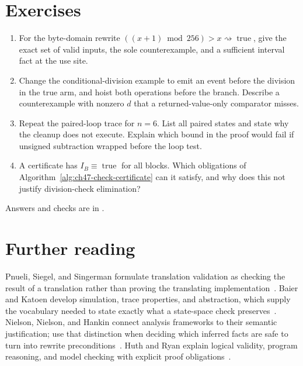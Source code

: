 \section{Exercises}
\label{sec:ch47-exercises}

\begin{enumerate}
\item For the byte-domain rewrite $((x+1)\bmod256)>x\rightsquigarrow\operatorname{true}$, give the exact set of valid inputs, the sole counterexample, and a sufficient interval fact at the use site.\label{ex:ch47-byte-guard}
\item Change the conditional-division example to emit an event before the division in the true arm, and hoist both operations before the branch. Describe a counterexample with nonzero $d$ that a returned-value-only comparator misses.\label{ex:ch47-event-hoist}
\item Repeat the paired-loop trace for $n=6$. List all paired states and state why the cleanup does not execute. Explain which bound in the proof would fail if unsigned subtraction wrapped before the loop test.\label{ex:ch47-loop-pairs}
\item A certificate has $I_B\equiv\operatorname{true}$ for all blocks. Which obligations of Algorithm~\ref{alg:ch47-check-certificate} can it satisfy, and why does this not justify division-check elimination?\label{ex:ch47-vacuous-certificate}
\end{enumerate}
Answers and checks are in .

\section{Further reading}
\label{sec:ch47-reading}

Pnueli, Siegel, and Singerman formulate translation validation as checking the result of a translation rather than proving the translating implementation~\cite{pnueli-1998-validation}.
Baier and Katoen develop simulation, trace properties, and abstraction, which supply the vocabulary needed to state exactly what a state-space check preserves~\cite{baier-2008-model-checking}.
Nielson, Nielson, and Hankin connect analysis frameworks to their semantic justification; use that distinction when deciding which inferred facts are safe to turn into rewrite preconditions~\cite{nielson-1999-principles}.
Huth and Ryan explain logical validity, program reasoning, and model checking with explicit proof obligations~\cite{huth-2004-logic}.
